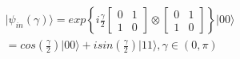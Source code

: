 \begin{equation}
\label{eq:2_4:estado_inicial_prisioneiro}
\begin{split}
\vert\psi_{in}(\gamma)\rangle=exp\left\{ i\frac{\gamma}{2}\left[\begin{array}{cc}
0 & 1\\
1 & 0
\end{array}\right]\otimes\left[\begin{array}{cc}
0 & 1\\
1 & 0
\end{array}\right]\right\} \vert00\rangle \\
=cos(\frac{\gamma}{2})\vert00\rangle+isin(\frac{\gamma}{2})\vert11\rangle,\gamma\in(0,\pi)
\end{split}
\end{equation}





